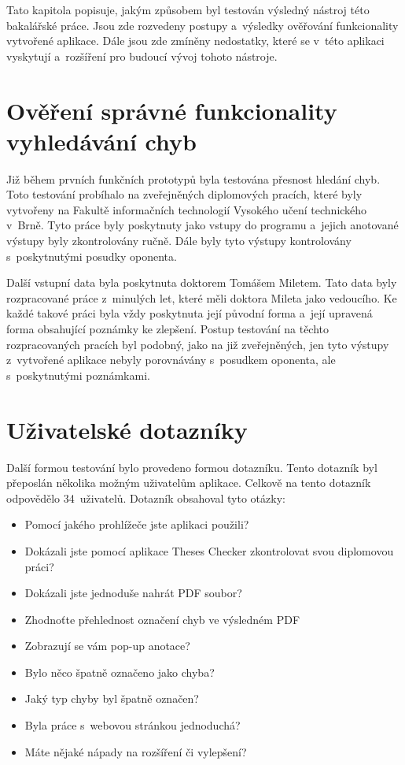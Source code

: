 Tato kapitola popisuje, jakým způsobem byl testován výsledný nástroj této
bakalářské práce. Jsou zde rozvedeny postupy a~výsledky ověřování funkcionality
vytvořené aplikace. Dále jsou zde zmíněny nedostatky, které se v~této aplikaci
vyskytují a~rozšíření pro budoucí vývoj tohoto nástroje. 



\section{Ověření správné funkcionality vyhledávání chyb}
Již během prvních funkčních prototypů byla testována přesnost hledání
chyb. Toto testování probíhalo na zveřejněných diplomových pracích, které byly
vytvořeny na Fakultě informačních technologií Vysokého učení technického v~Brně.
Tyto práce byly poskytnuty jako vstupy do programu a~jejich anotované
výstupy byly zkontrolovány ručně. Dále byly tyto výstupy kontrolovány
s~poskytnutými posudky oponenta.

Další vstupní data byla poskytnuta doktorem Tomášem Miletem. Tato data
byly rozpracované práce z~minulých let, které měli doktora Mileta jako
vedoucího. Ke každé takové práci byla vždy poskytnuta její původní forma
a~její upravená forma obsahující poznámky ke zlepšení. Postup testování
na těchto rozpracovaných pracích byl podobný, jako na již zveřejněných, 
jen tyto výstupy z~vytvořené aplikace nebyly porovnávány s~posudkem oponenta,
ale s~poskytnutými poznámkami.



\section{Uživatelské dotazníky}
Další formou testování bylo provedeno formou dotazníku.
Tento dotazník byl přeposlán několika možným uživatelům
aplikace. Celkově na tento dotazník odpovědělo
34~uživatelů. Dotazník obsahoval tyto otázky:
\begin{itemize}
    \item Pomocí jakého prohlížeče jste aplikaci použili?
    \item Dokázali jste pomocí aplikace Theses Checker zkontrolovat svou
    diplomovou práci?
    \item Dokázali jste jednoduše nahrát PDF soubor?
    \item Zhodnoťte přehlednost označení chyb ve výsledném PDF
    \item Zobrazují se vám pop-up anotace?
    \item Bylo něco špatně označeno jako chyba?
    \item Jaký typ chyby byl špatně označen?
    \item Byla práce s~webovou stránkou jednoduchá?
    \item Máte nějaké nápady na rozšíření či vylepšení?
\end{itemize}

